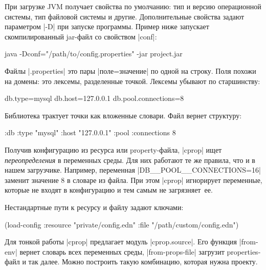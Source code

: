 При загрузке JVM получает свойства по умолчанию: тип и версию операционной
системы, тип файловой системы и другие. Дополнительные свойства задают
параметром \spverb|-D| при запуске программы. Пример ниже запускает
скомпилированный jar-файл со свойством \spverb|conf|:

\begin{english}
  \begin{bash}
java -Dconf="/path/to/config.properties" -jar project.jar
  \end{bash}
\end{english}

Файлы \spverb|.properties| это пары \spverb|поле=значение| по одной на
строку. Поля похожи на домены: это лексемы, разделенные точкой. Лексемы убывают
по старшинству:

\begin{english}
  \begin{ini}
db.type=mysql
db.host=127.0.0.1
db.pool.connections=8
  \end{ini}
\end{english}

Библиотека трактует точки как вложенные словари. Файл вернет структуру:

\begin{english}
  \begin{clojure}
{:db {:type "mysql"
      :host "127.0.0.1"
      :pool {:connections 8}}}
  \end{clojure}
\end{english}

Получив конфигурацию из ресурса или property-файла, \spverb|cprop| ищет
\emph{переопределения} в переменных среды. Для них работают те же правила, что и
в нашем загрузчике. Например, переменная \spverb|DB__POOL__CONNECTIONS=16|
заменит значение 8 в словаре из файла. При этом \spverb|cprop| игнорирует
переменные, которые не входят в конфигурацию и тем самым не загрязняет~ее.

Нестандартные пути к ресурсу и файлу задают ключами:

\begin{english}
  \begin{clojure}
(load-config
 :resource "private/config.edn"
 :file "/path/custom/config.edn")
  \end{clojure}
\end{english}

Для тонкой работы \spverb|cprop| предлагает модуль \spverb|cprop.source|. Его
функция \spverb|from-env| вернет словарь всех переменных среды,
\spverb|from-props-file| загрузит properties-файл и так далее. Можно построить
такую комбинацию, которая нужна проекту.

